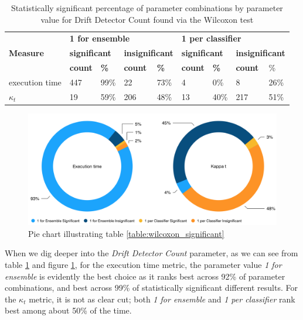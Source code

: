 \begin{table}[]
\centering
\caption{\label{table:wilcoxon_drift_detector_count}Statistically significant percentage of parameter combinations by parameter value for Drift Detector Count found via the Wilcoxon test}
\begin{tabular}{|l|l|l|l|l|l|l|l|l|}
\hline
\multirow{3}{*}{\textbf{Measure}} & \multicolumn{4}{l|}{\textbf{1 for ensemble}} & \multicolumn{4}{l|}{\textbf{1 per classifier}} \\ \cline{2-9} 
 & \multicolumn{2}{l|}{\textbf{significant}} & \multicolumn{2}{l|}{\textbf{insignificant}} & \multicolumn{2}{l|}{\textbf{significant}} & \multicolumn{2}{l|}{\textbf{insignificant}} \\ \cline{2-9} 
 & \textbf{count} & \textbf{\%} & \textbf{count} & \textbf{\%} & \textbf{count} & \textbf{\%} & \textbf{count} & \% \\ \hline \hhline{=========}
execution time & 447 & 99\% & 22 & 73\% & 4 & 0\% & 8 & 26\% \\ \hline
$\kappa_t$ & 19 & 59\% & 206 & 48\% & 13 & 40\% & 217 & 51\% \\ \hline
\end{tabular}
\end{table}


\begin{figure}
\centering
  \includegraphics[width=\linewidth]{./images/chapter5/wilcoxon_drift_detector_count_pie}
\caption{\label{fig:wilcoxon_drift_detector_count_pie}Pie chart illustrating table \ref{table:wilcoxon_significant}}
\end{figure}



When we dig deeper into the \textit{Drift Detector Count} parameter, as we can see from table \ref{table:wilcoxon_drift_detector_count} and figure \ref{fig:wilcoxon_drift_detector_count_pie}, for the execution time metric, the parameter value \textit{1 for ensemble} is evidently the best choice as it ranks best across 92\% of parameter combinations, and best across 99\% of statistically significant different results. For the $\kappa_t$ metric, it is not as clear cut; both \textit{1 for ensemble} and \textit{1 per classifier} rank best among about 50\% of the time. 

